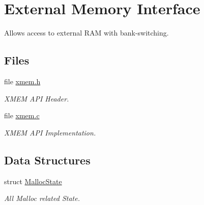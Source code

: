 \hypertarget{group__xmem}{\section{External Memory Interface}
\label{group__xmem}
}


Allows access to external R\-A\-M with bank-\/switching.  


\subsection*{Files}
\begin{DoxyCompactItemize}
\item 
file \hyperlink{xmem_8h}{xmem.\-h}
\begin{DoxyCompactList}\small\item\em X\-M\-E\-M A\-P\-I Header. \end{DoxyCompactList}\item 
file \hyperlink{xmem_8c}{xmem.\-c}
\begin{DoxyCompactList}\small\item\em X\-M\-E\-M A\-P\-I Implementation. \end{DoxyCompactList}\end{DoxyCompactItemize}
\subsection*{Data Structures}
\begin{DoxyCompactItemize}
\item 
struct \hyperlink{struct_malloc_state}{Malloc\-State}
\begin{DoxyCompactList}\small\item\em All Malloc related State. \end{DoxyCompactList}\end{DoxyCompactItemize}
